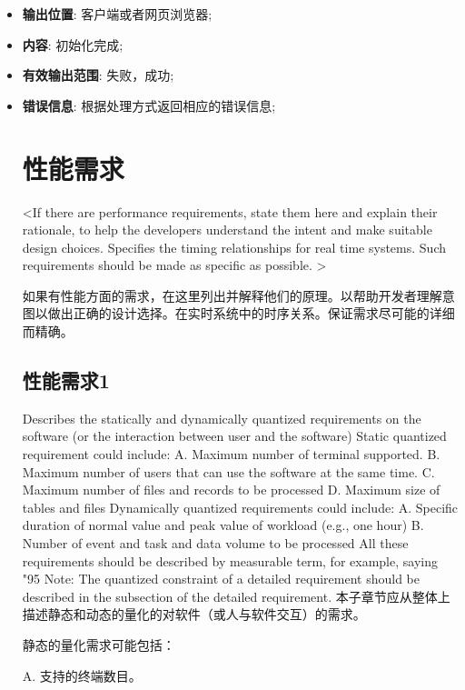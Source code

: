 \begin{itemize}
\item \textbf{输出位置}: 客户端或者网页浏览器;
\item \textbf{内容}: 初始化完成;
\item \textbf{有效输出范围}: {失败，成功};
  \item \textbf{错误信息}: 根据处理方式返回相应的错误信息;

\section{性能需求}
<If there are performance requirements, state them here and explain their rationale, to help the developers understand the intent and make suitable design choices. Specifies the timing relationships for real time systems. Such requirements should be made as specific as possible. >

如果有性能方面的需求，在这里列出并解释他们的原理。以帮助开发者理解意图以做出正确的设计选择。在实时系统中的时序关系。保证需求尽可能的详细而精确。
\subsection{性能需求1}
Describes the statically and dynamically quantized requirements on the software (or the interaction between user and the software)
Static quantized requirement could include:
A. Maximum number of terminal supported.
B. Maximum number of users that can use the software at the same time.
C. Maximum number of files and records to be processed
D. Maximum size of  tables and files
Dynamically quantized requirements could include:
A. Specific duration of normal value and peak value of workload (e.g., one hour)
B. Number of event and task and data volume to be processed 
All these requirements should be described by measurable term, for example, saying "95%
Note: The quantized constraint of a detailed requirement should be described in the subsection of the detailed requirement.
本子章节应从整体上描述静态和动态的量化的对软件（或人与软件交互）的需求。

静态的量化需求可能包括：

A. 支持的终端数目。


\end{itemize}

